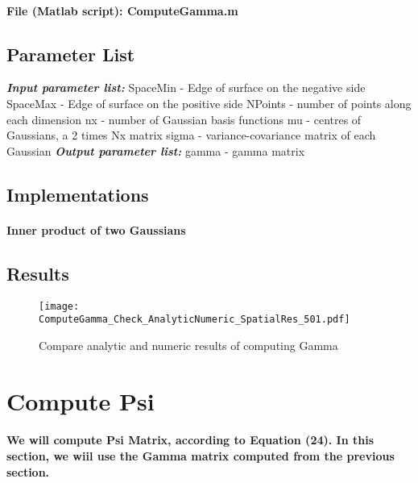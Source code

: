 \documentclass[a4paper, 12pt, english]{article}
\begin{document}
\paragraph{File (Matlab script): ComputeGamma.m}

\subsection{Parameter List}
\textbf{\textit{Input parameter list:}}\newline
SpaceMin - Edge of surface on the negative side\newline
SpaceMax - Edge of surface on the positive side\newline
NPoints - number of points along each dimension\newline
nx - number of Gaussian basis functions\newline
mu - centres of Gaussians, a 2 times Nx matrix\newline
sigma - variance-covariance matrix of each Gaussian\newline
\textbf{\textit{Output parameter list:}}\newline
gamma - gamma matrix

\subsection{Implementations}
\paragraph{Inner product of two Gaussians\newline}



\subsection{Results}
\begin{figure}[H]
\centering
\texttt{[image: ComputeGamma\_Check\_AnalyticNumeric\_SpatialRes\_501.pdf]}
\caption{Compare analytic and numeric results of computing Gamma}
\end{figure}

\newpage



\section{Compute Psi}
\paragraph{We will compute Psi Matrix, according to Equation (24). In this section, we
wiil use the Gamma matrix computed from the previous section.}
\end{document}
